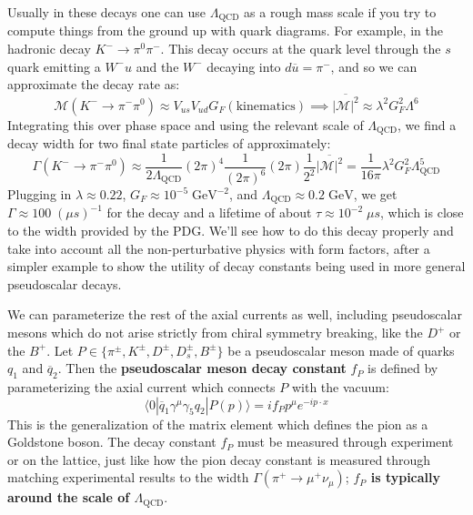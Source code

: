 \documentclass[11pt, oneside]{article}   	%
\theoremstyle{definition}
\numberwithin{equation}{subsection}		%
\begin{document}
Usually in these decays one can use $\Lambda_\mathrm{QCD}$ as a rough mass scale if you try to compute things from the ground up with 
quark diagrams. For example, in the hadronic decay $K^-\rightarrow\pi^0\pi^-$. This decay occurs at the quark level through the $s$ quark 
emitting a $W^- u$ and the $W^-$ decaying into $d\overline u = \pi^-$, and so we can approximate the decay rate as:
\begin{equation}
	\mathcal M(K^-\rightarrow\pi^-\pi^0)\approx V_{us} V_{ud} G_F (\mathrm{kinematics})\implies \overline{|\mathcal M|^2}\approx \lambda^2 G_F^2 \Lambda^6
\end{equation}
Integrating this over phase space and using the relevant scale of $\Lambda_\mathrm{QCD}$, we find a decay width for two final state particles 
of approximately:
\begin{equation}
	\Gamma(K^-\rightarrow\pi^-\pi^0)\approx \frac{1}{2\Lambda_\mathrm{QCD}}(2\pi)^4\frac{1}{(2\pi)^6}(2\pi)\frac{1}{2^2}\overline{|\mathcal M|^2} = \frac{1}{16\pi}\lambda^2 G_F^2 
	\Lambda_\mathrm{QCD}^5
\end{equation}
Plugging in $\lambda\approx 0.22$, $G_F \approx 10^{-5} \;\mathrm{GeV}^{-2}$, and $\Lambda_\mathrm{QCD}\approx 0.2\;\mathrm{GeV}$, we get 
$\Gamma\approx 100 \;(\mu s)^{-1}$ for the decay and a lifetime of about $\tau\approx 10^{-2} \;\mu s$, which is close to the width provided by the PDG.
We'll see how to do this decay properly and take into account all the non-perturbative physics with form factors, after a simpler example to show 
the utility of decay constants being used in more general pseudoscalar decays.

We can parameterize the rest of the axial currents as well, including pseudoscalar mesons which do not arise strictly from chiral 
symmetry breaking, like the $D^+$ or the $B^+$. Let $P\in \{\pi^\pm, K^\pm, D^\pm, D_s^\pm, B^\pm\}$ be a pseudoscalar meson 
made of quarks $q_1$ and $\overline q_2$. Then the \textbf{pseudoscalar meson decay constant} $f_P$ is defined by parameterizing 
the axial current which connects $P$ with the vacuum:
\begin{equation}
	\langle 0 | \overline q_1 \gamma^\mu \gamma_5 q_2 | P(p)\rangle = i f_P p^\mu e^{-ip\cdot x}
\end{equation}
This is the generalization of the matrix element which defines the pion as a Goldstone boson. The decay constant $f_P$ must be measured 
through experiment or on the lattice, just like how the pion decay constant is measured through matching experimental results to 
the width $\Gamma(\pi^+\rightarrow\mu^+ \nu_\mu)$; \textbf{$f_P$ is typically around the scale of $\Lambda_\mathrm{QCD}$}. 
\end{document}
